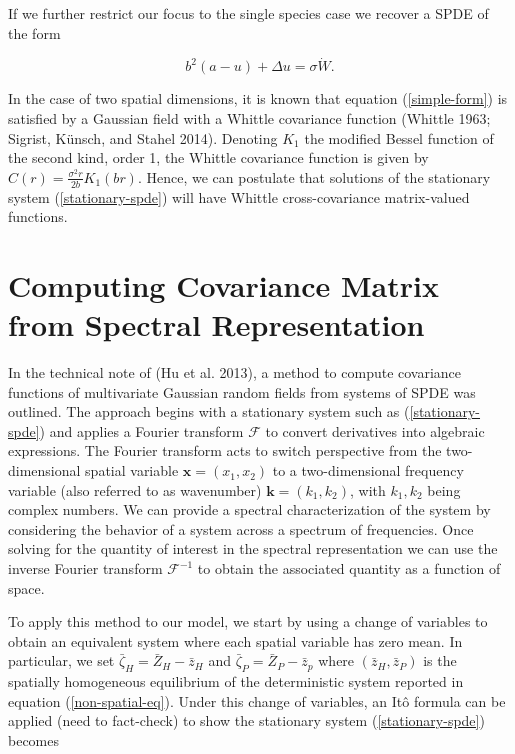 \documentclass{article}
\begin{document}
If we further restrict our focus to the single species case we recover a
SPDE of the form

\begin{equation}\label{simple-form}
  b^2(a-u)+\Delta u=\sigma\dot W.
\end{equation}

In the case of two spatial dimensions, it is known that equation
(\ref{simple-form}) is satisfied by a Gaussian field with a Whittle
covariance function (Whittle 1963; Sigrist, Künsch, and Stahel 2014).
Denoting \(K_1\) the modified Bessel function of the second kind, order
1, the Whittle covariance function is given by
\(C(r)=\frac{\sigma^2r}{2b}K_1(br)\). Hence, we can postulate that
solutions of the stationary system (\ref{stationary-spde}) will have
Whittle cross-covariance matrix-valued functions.

\hypertarget{computing-covariance-matrix-from-spectral-representation}{%
\section{Computing Covariance Matrix from Spectral
Representation}\label{computing-covariance-matrix-from-spectral-representation}}

In the technical note of (Hu et al. 2013), a method to compute
covariance functions of multivariate Gaussian random fields from systems
of SPDE was outlined. The approach begins with a stationary system such
as (\ref{stationary-spde}) and applies a Fourier transform
\(\mathcal F\) to convert derivatives into algebraic expressions. The
Fourier transform acts to switch perspective from the two-dimensional
spatial variable \(\pmb x=(x_1,x_2)\) to a two-dimensional frequency
variable (also referred to as wavenumber) \(\pmb k=(k_1,k_2)\), with
\(k_1,k_2\) being complex numbers. We can provide a spectral
characterization of the system by considering the behavior of a system
across a spectrum of frequencies. Once solving for the quantity of
interest in the spectral representation we can use the inverse Fourier
transform \(\mathcal F^{-1}\) to obtain the associated quantity as a
function of space.

To apply this method to our model, we start by using a change of
variables to obtain an equivalent system where each spatial variable has
zero mean. In particular, we set \(\bar\zeta_H=\bar Z_H-\bar z_H\) and
\(\bar\zeta_P=\bar Z_P-\bar z_p\) where \((\bar z_H,\bar z_P)\) is the
spatially homogeneous equilibrium of the deterministic system reported
in equation (\ref{non-spatial-eq}). Under this change of variables, an
Itô formula can be applied (need to fact-check) to show the stationary
system (\ref{stationary-spde}) becomes
\end{document}
